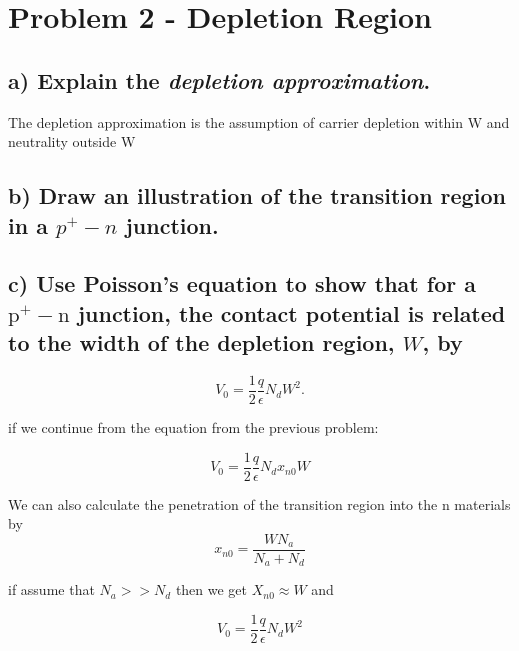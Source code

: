 \section{Problem 2 - Depletion Region}

\subsection*{a) Explain the \textit{depletion approximation}.}

The depletion approximation is the assumption of carrier depletion within W and neutrality outside W

\subsection*{b) Draw an illustration of the transition region in a $p^+-n$ junction.}


\subsection*{c) Use Poisson's equation to show that for a \( \mathrm{p}^{+}-\mathrm{n} \) junction, the contact potential is related to the width of the depletion region, \( W \), by}
\[V_{0}=\frac{1}{2} \frac{q}{\epsilon} N_{d} W^{2} .\]

if we continue from the equation from the previous problem:

\[V_0=\frac{1}{2}\frac{q}{\epsilon}N_dx_{n0}W\]

We can also calculate the penetration of the transition region into the n materials by
\[x_{n0}=\frac{WN_a}{N_a+N_d}\]

if assume that $N_a>>N_d$ then we get $X_{n0}\approx W$ and 

\[V_{0}=\frac{1}{2} \frac{q}{\epsilon} N_{d} W^{2} \]
